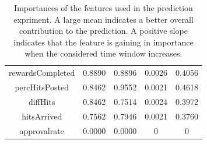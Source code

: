 \begin{table}[ht]
\begin{tabular}{|c|c|c|c|c|}
rewardsCompleted     &  0.8890 &  0.8896 & 0.0026 & 0.4056 \\
percHitsPosted       &  0.8462 &  0.9552 & 0.0021 & 0.4618 \\
diffHits             &  0.8462 &  0.7514 & 0.0024 & 0.3972 \\
hitsArrived          &  0.7562 &  0.7946 & 0.0021 & 0.3760 \\
approvalrate         &  0.0000 &  0.0000 & 0 & 0 \\
\hline
\end{tabular}
\caption {Importances of the features used in the prediction expriment. A large mean indicates a better overall contribution to the prediction. A positive slope indicates that the feature is gaining in importance when the considered time window increases.}
\label{table:feats}
\end{table}